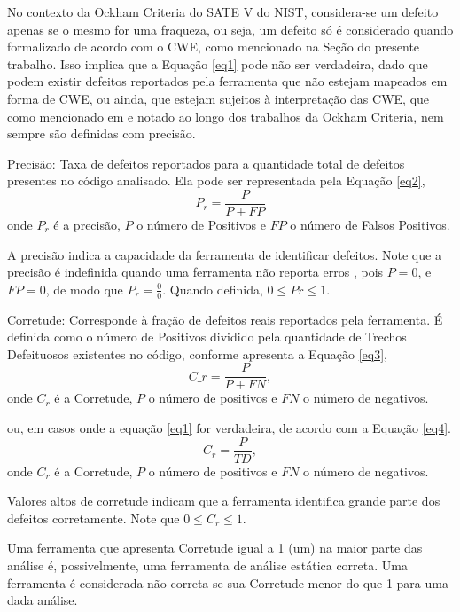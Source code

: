   No contexto da Ockham Criteria do SATE V do NIST, considera-se um defeito apenas se o mesmo for uma fraqueza, ou seja, um defeito só é considerado quando formalizado de acordo com o CWE, como mencionado   na Seção  do presente trabalho. Isso implica que a Equação \eqref{eq1} pode não ser verdadeira, dado que podem existir defeitos reportados pela ferramenta que não estejam mapeados em forma de CWE, ou ainda, que estejam sujeitos à interpretação das CWE, que como mencionado em \cite{yan} e notado ao longo dos trabalhos  da Ockham Criteria, nem sempre são definidas com precisão.

  Precisão: Taxa de defeitos reportados para a quantidade total de defeitos presentes no código analisado.  Ela pode ser representada pela Equação \eqref{eq2},
\begin{equation}\label{eq2}
  P_r = \frac{P}{P + FP}
\end{equation}
  onde $P_r$ é a precisão, $P$ o número de Positivos e $FP$ o número de Falsos Positivos.

  A precisão indica a capacidade da ferramenta de identificar defeitos. Note que a precisão é indefinida quando uma ferramenta não reporta erros \cite{nsa}, pois $P = 0$, e $FP = 0$, de modo que $P_r = \frac{0}{0}$. Quando definida, $0 \leq Pr \leq 1$.

  Corretude: Corresponde à fração de defeitos reais reportados pela ferramenta. É definida como o número de Positivos dividido pela quantidade de Trechos Defeituosos existentes no código, conforme apresenta a Equação \eqref{eq3},
\begin{equation}\label{eq3}
  C\_r = \frac{P}{P + FN},
\end{equation}
  onde $C_r$ é a Corretude, $P$ o número de positivos e $FN$ o número de negativos.

  ou, em casos onde a equação \eqref{eq1} for verdadeira, de acordo com a Equação \eqref{eq4}.
\begin{equation}\label{eq4}
  C_r = \frac{P}{TD},
\end{equation}
  onde $C_r$ é a Corretude, $P$ o número de positivos e $FN$ o número de negativos.

  Valores altos de corretude indicam que a ferramenta identifica grande parte dos defeitos corretamente. Note que $0 \leq C_r \leq 1$.

  Uma ferramenta que apresenta Corretude igual a 1 (um) na maior parte das análise é, possivelmente, uma ferramenta de análise estática correta. Uma ferramenta é considerada não correta se sua Corretude  menor do que 1 para uma dada análise.

